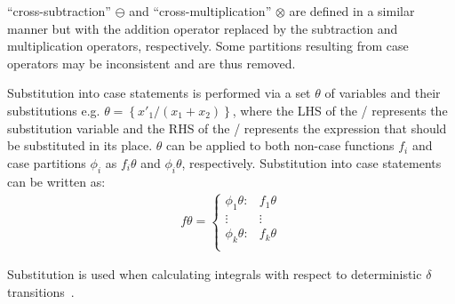 ``cross-subtraction'' {\footnotesize$\ominus$} and ``cross-multiplication'' {\footnotesize$\otimes$} are defined in a similar manner but with the addition operator replaced by the subtraction and multiplication operators, respectively. Some partitions resulting from case operators may be inconsistent and are thus removed.

Substitution into case statements is performed via a set {\footnotesize$\theta$} of variables and their substitutions e.g. {\footnotesize$\theta = \left\{ x'_1/(x_1 + x_2) \right\}$}, where the LHS of the / represents the substitution variable and the RHS of the / represents the expression that should be substituted in its place. {\footnotesize$\theta$} can be applied to both non-case functions {\footnotesize$f_i$} and case partitions {\footnotesize$\phi_i$} as {\footnotesize$f_i\theta$} and {\footnotesize$\phi_i\theta$}, respectively. Substitution into case statements can be written as:
{\footnotesize 
    \abovedisplayskip=5pt
    \belowdisplayskip=0pt
    \begin{align*}
        f\theta = 
        \begin{cases}
            \phi_1\theta: & f_1\theta \\ 
            \vdots & \vdots\\ 
            \phi_k\theta: & f_k\theta \\ 
        \end{cases}
    \end{align*}
}%

Substitution is used when calculating integrals with respect to deterministic {\footnotesize$\delta$} transitions~\parencite{Sanner_UAI_2011}.


